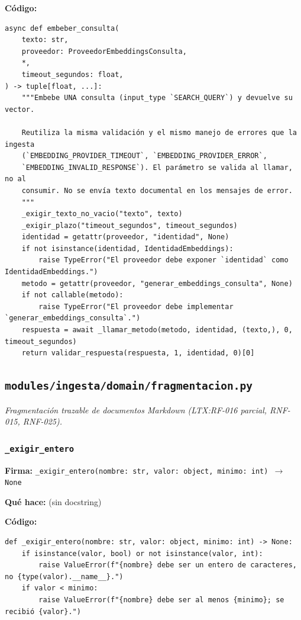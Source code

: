 \documentclass[11pt,a4paper]{article}
\begin{document}
\textbf{Código:}
\begin{lstlisting}
async def embeber_consulta(
    texto: str,
    proveedor: ProveedorEmbeddingsConsulta,
    *,
    timeout_segundos: float,
) -> tuple[float, ...]:
    """Embebe UNA consulta (input_type `SEARCH_QUERY`) y devuelve su vector.

    Reutiliza la misma validación y el mismo manejo de errores que la ingesta
    (`EMBEDDING_PROVIDER_TIMEOUT`, `EMBEDDING_PROVIDER_ERROR`,
    `EMBEDDING_INVALID_RESPONSE`). El parámetro se valida al llamar, no al
    consumir. No se envía texto documental en los mensajes de error.
    """
    _exigir_texto_no_vacio("texto", texto)
    _exigir_plazo("timeout_segundos", timeout_segundos)
    identidad = getattr(proveedor, "identidad", None)
    if not isinstance(identidad, IdentidadEmbeddings):
        raise TypeError("El proveedor debe exponer `identidad` como IdentidadEmbeddings.")
    metodo = getattr(proveedor, "generar_embeddings_consulta", None)
    if not callable(metodo):
        raise TypeError("El proveedor debe implementar `generar_embeddings_consulta`.")
    respuesta = await _llamar_metodo(metodo, identidad, (texto,), 0, timeout_segundos)
    return validar_respuesta(respuesta, 1, identidad, 0)[0]
\end{lstlisting}

\subsection{\texttt{modules/ingesta/domain/fragmentacion.py}}
\textit{Fragmentación trazable de documentos Markdown (LTX:RF-016 parcial, RNF-015, RNF-025).}

\subsubsection*{\texttt{\_exigir\_entero}}
\textbf{Firma:} \texttt{\_exigir\_entero(nombre: str, valor: object, minimo: int) $\rightarrow$ None}

\textbf{Qué hace:} (sin docstring)

\textbf{Código:}
\begin{lstlisting}
def _exigir_entero(nombre: str, valor: object, minimo: int) -> None:
    if isinstance(valor, bool) or not isinstance(valor, int):
        raise ValueError(f"{nombre} debe ser un entero de caracteres, no {type(valor).__name__}.")
    if valor < minimo:
        raise ValueError(f"{nombre} debe ser al menos {minimo}; se recibió {valor}.")
\end{lstlisting}
\end{document}
